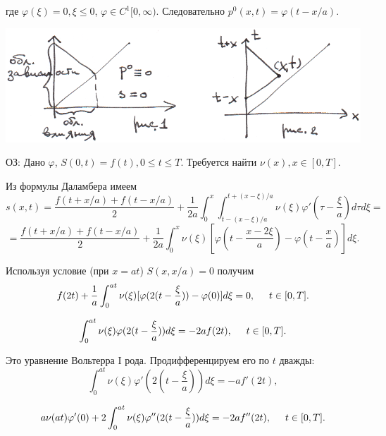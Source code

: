 \documentclass{article}
\begin{document}
где $\varphi(\xi) = 0, \xi \leqslant 0$, $\varphi \in C^1[0, \infty)$. Следовательно $p^0(x,t) = \varphi(t-x/a)$.


\vspace{0.2cm}
\includegraphics[scale=0.55]{pic5_2.png}
\vspace{0.2cm}


ОЗ: Дано $\varphi$, $S(0,t) = f(t), 0 \leqslant t \leqslant T$. Требуется найти $\nu(x), x \in [0,T]$.

Из формулы Даламбера имеем
\begin{equation*}
	s(x,t) = \dfrac{f(t + x/a) + f(t - x/a)}{2} +
	\dfrac{1}{2a} \int_0^x \int_{t-(x-\xi)/a}^{t+(x-\xi)/a} \nu(\xi) \varphi'(\tau - \frac{\xi}{a}) d\tau d\xi =
\end{equation*}
\begin{equation*}
	= \dfrac{f(t + x/a) + f(t - x/a)}{2} +
	\dfrac{1}{2a} \int_0^x \nu(\xi) [ \varphi(t - \frac{x-2\xi}{a}) - \varphi(t - \frac{x}{a})] d\xi.
\end{equation*}

Используя условие (при $x = at$) $S(x,x/a) = 0$ получим 
\begin{equation*}
	f(2t) + \dfrac{1}{a} \int_0^{at} \nu(\xi) [\varphi(2(t - \frac{\xi}{a})) - \varphi(0)] d\xi = 0,
	 \hspace{0.5cm} t \in [0,T].
\end{equation*}

\begin{equation*}
	\int_0^{at} \nu(\xi) \varphi(2(t - \frac{\xi}{a})) d\xi = - 2 a f(2t), 
	\hspace{0.5cm} t \in [0,T].
\end{equation*}

Это уравнение Вольтерра I рода. Продифференцируем его по $t$ дважды:
\begin{equation*}
	\int_0^{at} \nu(\xi) \varphi'(2(t - \frac{\xi}{a})) d\xi = -  a f'(2t),
\end{equation*}

\begin{equation*}
	a \nu(at) \varphi'(0) + 2 \int_0^{at} \nu(\xi) \varphi''(2(t - \frac{\xi}{a})) d\xi = - 2 a f''(2t), 
	\hspace{0.5cm} t \in [0,T].
\end{equation*}
\end{document}
